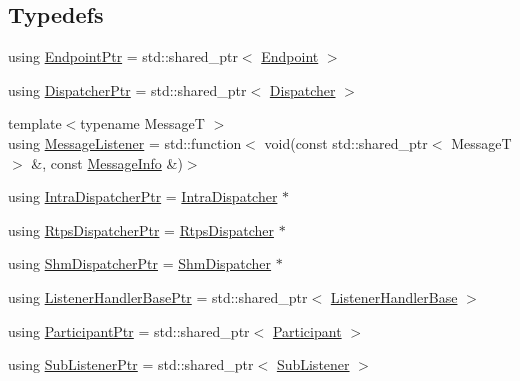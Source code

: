 \subsection*{Typedefs}
\begin{DoxyCompactItemize}
\item 
using \hyperlink{namespaceapollo_1_1cyber_1_1transport_ad38e6aae033358e75827d6b4ac75caf8}{Endpoint\-Ptr} = std\-::shared\-\_\-ptr$<$ \hyperlink{classapollo_1_1cyber_1_1transport_1_1Endpoint}{Endpoint} $>$
\item 
using \hyperlink{namespaceapollo_1_1cyber_1_1transport_abba04e3e93745dd7020da6aa697cf165}{Dispatcher\-Ptr} = std\-::shared\-\_\-ptr$<$ \hyperlink{classapollo_1_1cyber_1_1transport_1_1Dispatcher}{Dispatcher} $>$
\item 
{\footnotesize template$<$typename Message\-T $>$ }\\using \hyperlink{namespaceapollo_1_1cyber_1_1transport_aade3f4d41770972ae44166cdde27e2d8}{Message\-Listener} = std\-::function$<$ void(const std\-::shared\-\_\-ptr$<$ Message\-T $>$ \&, const \hyperlink{classapollo_1_1cyber_1_1transport_1_1MessageInfo}{Message\-Info} \&)$>$
\item 
using \hyperlink{namespaceapollo_1_1cyber_1_1transport_af059bf179d7ece8cb6ee52f0157568de}{Intra\-Dispatcher\-Ptr} = \hyperlink{classapollo_1_1cyber_1_1transport_1_1IntraDispatcher}{Intra\-Dispatcher} $\ast$
\item 
using \hyperlink{namespaceapollo_1_1cyber_1_1transport_a52a5f048384d7613248f6b93957ca0be}{Rtps\-Dispatcher\-Ptr} = \hyperlink{classapollo_1_1cyber_1_1transport_1_1RtpsDispatcher}{Rtps\-Dispatcher} $\ast$
\item 
using \hyperlink{namespaceapollo_1_1cyber_1_1transport_ad2181d36e971d8b74b322f8e2e3b36de}{Shm\-Dispatcher\-Ptr} = \hyperlink{classapollo_1_1cyber_1_1transport_1_1ShmDispatcher}{Shm\-Dispatcher} $\ast$
\item 
using \hyperlink{namespaceapollo_1_1cyber_1_1transport_a7748946e9ae4f2e24a82aadd4f02d3b6}{Listener\-Handler\-Base\-Ptr} = std\-::shared\-\_\-ptr$<$ \hyperlink{classapollo_1_1cyber_1_1transport_1_1ListenerHandlerBase}{Listener\-Handler\-Base} $>$
\item 
using \hyperlink{namespaceapollo_1_1cyber_1_1transport_a4214d0780331276d0384d0b57e3bc688}{Participant\-Ptr} = std\-::shared\-\_\-ptr$<$ \hyperlink{classapollo_1_1cyber_1_1transport_1_1Participant}{Participant} $>$
\item 
using \hyperlink{namespaceapollo_1_1cyber_1_1transport_aeb00ea2a8b3d11c0ee1ed48d5cf3a4f5}{Sub\-Listener\-Ptr} = std\-::shared\-\_\-ptr$<$ \hyperlink{classapollo_1_1cyber_1_1transport_1_1SubListener}{Sub\-Listener} $>$

\end{DoxyCompactItemize}
